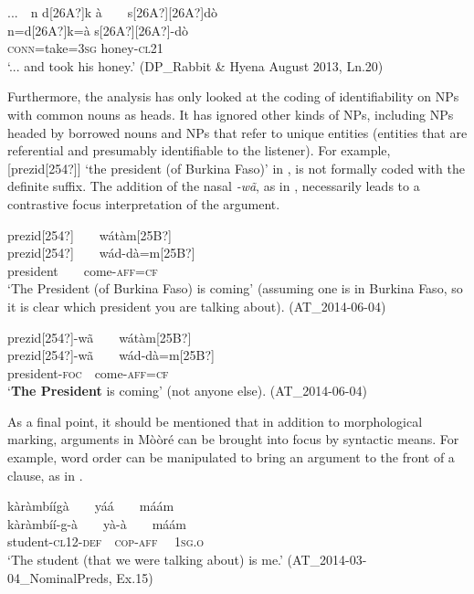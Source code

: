 \documentclass[output=paper]{langsci/langscibook}
\begin{document}
\ea\label{ex:teo:59}
\label{bkm:Ref264214412}...\ \ n d[26A?]k à\ \ \ \ s[26A?][26A?]dò\\
 n=d[26A?]k=à s[26A?][26A?]{}-dò\\
{ } \textsc{conn}=take=\textsc{3sg} honey\nobreakdash-\textsc{cl21}\\
\glt ‘... and took his honey.’ (DP\_Rabbit \& Hyena August 2013, Ln.20)
\z

Furthermore, the analysis has only looked at the coding of identifiability on NPs with common nouns as heads. It has ignored other kinds of NPs, including NPs headed by borrowed nouns and NPs that refer to unique entities (entities that are referential and presumably identifiable to the listener). For example, [prezid[254?]] ‘the president (of Burkina Faso)’ in , is not formally coded with the definite suffix. The addition of the nasal \textit{{}-wã}, as in , necessarily leads to a contrastive focus interpretation of the argument.

\ea\label{ex:teo:60}
\label{bkm:Ref264214488}prezid[254?]\ \ \ \ w\'{a}t\`{a}m[25B?]\\
\gll prezid[254?]\ \ \ \ wád-d\`{a}=m[25B?] \\
president\ \ \ \ come\textsc{{}-aff=cf}\\
\glt ‘The President (of Burkina Faso) is coming’ (assuming one is in Burkina Faso, so it is clear which president you are talking about). (AT\_2014-06-04)
\z

\ea\label{ex:teo:61}
\label{bkm:Ref264214496}prezid[254?]-wã\ \ \ \ w\'{a}t\`{a}m[25B?]\\
\gll prezid[254?]-wã\ \ \ \ wád-d\`{a}=m[25B?]\\
president-\textsc{foc}\ \ come\textsc{{}-aff=cf}\\
\glt ‘\textbf{The President} is coming’ (not anyone else). (AT\_2014-06-04)
\z

As a final point, it should be mentioned that in addition to morphological marking, arguments in Mòòré can be brought into focus by syntactic means. For example, word order can be manipulated to bring an argument to the front of a clause, as in .

\ea\label{ex:teo:62}
\label{bkm:Ref256674506}kàràmbíígà\ \ \ \ yá\'{a}\ \ \ \ máám\\
\gll kàràmbíí\nobreakdash-g\nobreakdash-à\ \ \ \ y\`{a}-\`{a}\ \ \ \ máám\\
student\nobreakdash-\textsc{cl12\nobreakdash-def}\ \ \textsc{cop-aff \ \ 1sg.o}\\
\glt ‘The student (that we were talking about) is me.’ (AT\_2014-03-04\_NominalPreds, Ex.15)
\z
\end{document}

